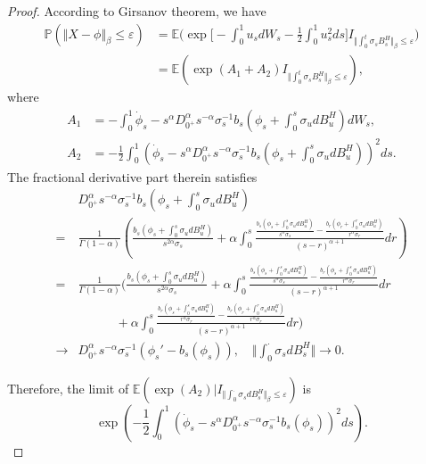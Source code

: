 \documentclass[10pt,a4paper]{amsart}
\begin{document}
\begin{proof}
According to Girsanov theorem, we have
	\begin{align*}
\mathbb{P}(\Vert X-\phi\Vert_\beta \leq \varepsilon)
&=\mathbb{E}\Big(\exp\Big[ -\int_0^1 u_s dW_s - \frac{1}{2} \int_0^1 u_s^2 ds\Big] I_{\Vert \int_0^t \sigma_s B^H_s\Vert_\beta \leq \varepsilon}\Big) \\
  &=	\mathbb{E}\left(\exp(A_1+A_2)I_{\Vert \int_0^t \sigma_s B^H_s\Vert_\beta \leq \varepsilon}\right),
\end{align*}
where
\begin{align*}
	A_1 &= -\int_0^1  \dot{\phi}_s-s^{\alpha}D_{0^+}^\alpha s^{-\alpha}  \sigma_s^{-1} b_s\left(\phi_s+\int_0^s \sigma_u dB^H_u\right)dW_s,\\
 	A_2 &= -\frac{1}{2}\int_0^1 \left(\dot{\phi}_s-s^{\alpha}D_{0^+}^\alpha s^{-\alpha}  \sigma_s^{-1} b_s\left(\phi_s+\int_0^s \sigma_u dB^H_u\right)\right)^2 ds.
\end{align*}
The fractional derivative part therein satisfies
\begin{align*}
	&D_{0^+}^\alpha s^{-\alpha}  \sigma_s^{-1} b_s\left(\phi_s+\int_0^s \sigma_u dB^H_u\right)\\
	=&\frac{1}{\Gamma(1-\alpha)}\left(\frac{b_s(\phi_s+\int_0^s \sigma_u dB^H_u)}{s^{2\alpha}\sigma_s}+\alpha\int_0^s \frac{\frac{b_s(\phi_s+\int_0^s \sigma_udB^H_u)}{s^\alpha \sigma_s}-\frac{b_r(\phi_r+\int_0^r \sigma_u dB^H_u)}{r^\alpha \sigma_r}}{(s-r)^{\alpha+1}}dr \right)\\
	=&\frac{1}{\Gamma(1-\alpha)}\Bigg(\frac{b_s(\phi_s+\int_0^s \sigma_u dB^H_u)}{s^{2\alpha}\sigma_s}+\alpha\int_0^s \frac{\frac{b_s(\phi_s+\int_0^s \sigma_udB^H_u)}{s^\alpha \sigma_s}-\frac{b_r(\phi_s+\int_0^s \sigma_u dB^H_u)}{r^\alpha \sigma_r}}{(s-r)^{\alpha+1}}dr   \\
	&\quad\quad\quad +\alpha\int_0^s \frac{\frac{b_r(\phi_s+\int_0^s \sigma_udB^H_u)}{r^\alpha \sigma_r}-\frac{b_r(\phi_r+\int_0^r \sigma_u dB^H_u)}{r^\alpha \sigma_r}}{(s-r)^{\alpha+1}}dr  \Bigg)\\
	\to & D_{0^+}^\alpha s^{-\alpha}  \sigma_s^{-1}\left(\phi_s' - b_s\left(\phi_s\right)\right),\quad   \Vert  \int_0^\cdot \sigma_s d B^H_s \Vert  \to 0.
\end{align*}


Therefore, the limit of $\mathbb{E}(\exp(A_2)| I_{\Vert \int_0^\cdot \sigma_s dB^H_s\Vert_\beta \leq \varepsilon})$ is 
\begin{equation*}
	\exp\left(-\frac{1}{2}\int_0^1 \left(\dot{\phi}_s-s^{\alpha}D_{0^+}^\alpha s^{-\alpha}  \sigma_s^{-1}b_s\left(\phi_s\right)\right)^2 ds\right).
\end{equation*} 


\end{proof}
\end{document}
